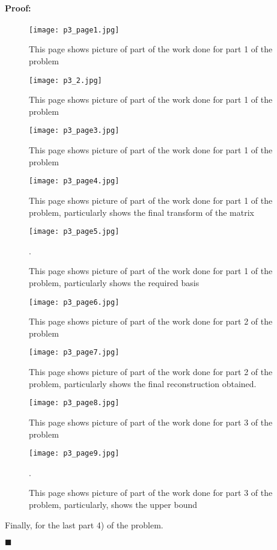 \documentclass[12pt]{article}
\newenvironment{proof}{\paragraph{Proof: }}{\hfill$\blacksquare$}
\begin{document}
\begin{proof}

\begin{figure}[!htbp]
\centering
\texttt{[image: p3\_page1.jpg]}
\caption{This page shows picture of part of the work done for part 1 of the problem}
\end{figure}

\begin{figure}[!htbp]
\centering
\texttt{[image: p3\_2.jpg]}
\caption{This page shows picture of part of the work done for part 1 of the problem}
\end{figure}

\begin{figure}[!htbp]
\centering
\texttt{[image: p3\_page3.jpg]}
\caption{This page shows picture of part of the work done for part 1 of the problem}
\end{figure}

\begin{figure}[!htbp]
\centering
\texttt{[image: p3\_page4.jpg]}
\caption{This page shows picture of part of the work done for part 1 of the problem, particularly shows the final transform of the matrix}
\end{figure}


\begin{figure}[!htbp]
\centering
\texttt{[image: p3\_page5.jpg]}
\caption{This page shows picture of part of the work done for part 1 of the problem, particularly shows the required basis}.
\end{figure}

\begin{figure}[!htbp]
\centering
\texttt{[image: p3\_page6.jpg]}
\caption{This page shows picture of part of the work done for part 2 of the problem}
\end{figure}

\begin{figure}[!htbp]
\centering
\texttt{[image: p3\_page7.jpg]}
\caption{This page shows picture of part of the work done for part 2 of the problem, particularly shows the final reconstruction obtained.}
\end{figure}


\begin{figure}[!htbp]
\centering
\texttt{[image: p3\_page8.jpg]}
\caption{This page shows picture of part of the work done for part 3 of the problem}
\end{figure}

\begin{figure}[!htbp]
\centering
\texttt{[image: p3\_page9.jpg]}
\caption{This page shows picture of part of the work done for part 3 of the problem, particularly, shows the upper bound}.
\end{figure}

Finally, for the last part 4) of the problem. 



\end{proof}
\end{document}
